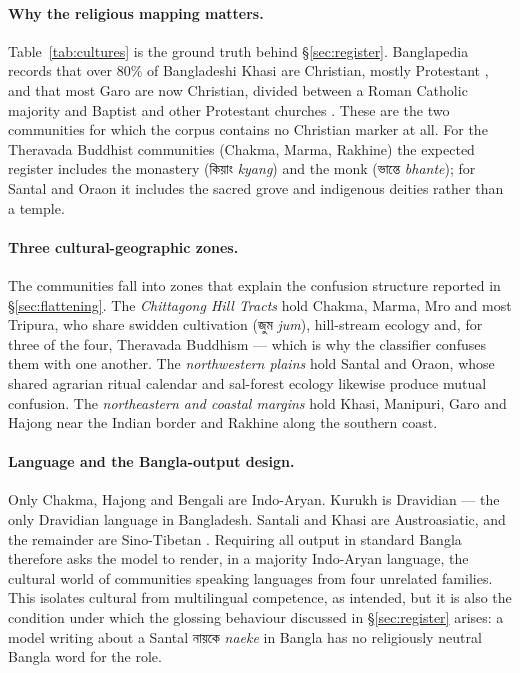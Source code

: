 \documentclass[11pt]{article}
\newcommand{\bn}[1]{{\bnfont #1}}
\begin{document}
\paragraph{Why the religious mapping matters.} Table~\ref{tab:cultures} is the
ground truth behind \S\ref{sec:register}. Banglapedia records that over 80\% of
Bangladeshi Khasi are Christian, mostly Protestant
\cite{banglapedia-khasia}, and that most Garo are now Christian, divided
between a Roman Catholic majority and Baptist and other Protestant churches
\cite{banglapedia-garo}. These are the two communities for which the corpus
contains no Christian marker at all. For the Theravada Buddhist communities
(Chakma, Marma, Rakhine) the expected register includes the monastery
(\bn{কিয়াং} \textit{kyang}) and the monk (\bn{ভান্তে} \textit{bhante}); for
Santal and Oraon it includes the sacred grove and indigenous deities rather
than a temple.

\paragraph{Three cultural-geographic zones.} The communities fall into zones
that explain the confusion structure reported in \S\ref{sec:flattening}. The
\emph{Chittagong Hill Tracts} hold Chakma, Marma, Mro and most Tripura, who
share swidden cultivation (\bn{জুম} \textit{jum}), hill-stream ecology and, for
three of the four, Theravada Buddhism --- which is why the classifier confuses
them with one another. The \emph{northwestern plains} hold Santal and Oraon,
whose shared agrarian ritual calendar and sal-forest ecology likewise produce
mutual confusion. The \emph{northeastern and coastal margins} hold Khasi,
Manipuri, Garo and Hajong near the Indian border and Rakhine along the
southern coast.

\paragraph{Language and the Bangla-output design.} Only Chakma, Hajong and
Bengali are Indo-Aryan. Kurukh is Dravidian --- the only Dravidian language in
Bangladesh. Santali and Khasi are Austroasiatic, and the remainder are
Sino-Tibetan \cite{glottolog}. Requiring all output in standard Bangla
therefore asks the model to render, in a majority Indo-Aryan language, the
cultural world of communities speaking languages from four unrelated families.
This isolates cultural from multilingual competence, as intended, but it is
also the condition under which the glossing behaviour discussed in
\S\ref{sec:register} arises: a model writing about a Santal \bn{নায়কে}
\textit{naeke} in Bangla has no religiously neutral Bangla word for the role.
\end{document}
